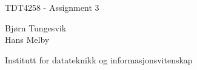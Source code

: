 \begin{titlepage}
    \begin{center}
      \large  
      
      \hfill
      
      \vfill
      
      \begingroup
      \LARGE TDT4258 - Assignment 3
      \bigskip
      \endgroup
      
      {\sc Bjørn Tungesvik}\\
      {\sc Hans Melby} \\
      
      \vspace{12cm}

      Institutt for datateknikk og informasjonsvitenskap 
       
    \end{center}  
\end{titlepage}
